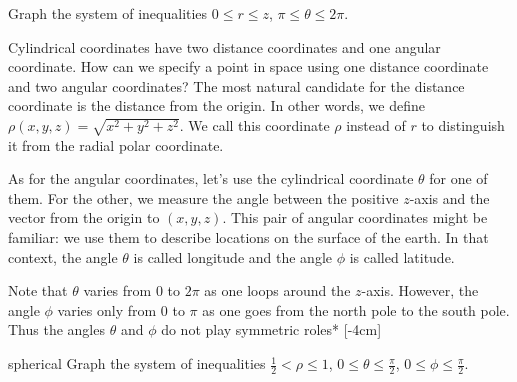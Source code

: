 \documentclass{watsonbook}
\begin{document}
\begin{exercise}{}{}
  Graph the system of inequalities $0 \leq r \leq z$, \: $\pi \leq \theta
  \leq 2\pi$. 
\end{exercise}

Cylindrical coordinates have two distance coordinates and one angular
coordinate. How can we specify a point in space using one distance
coordinate and two angular coordinates? The most natural candidate for
the distance coordinate is the distance from the origin. In other
words, we define $\rho(x,y,z) = \sqrt{x^2 + y^2 + z^2}$. We call this coordinate
$\rho$ instead of $r$ to distinguish it from the radial polar coordinate.

As for the angular coordinates, let's use the cylindrical coordinate
$\theta$ for one of them. For the other, we measure the angle between
the positive $z$-axis and the vector from the origin to
$(x,y,z)$. This pair of angular coordinates might be familiar: we use
them to describe locations on the surface of the earth. In that
context, the angle $\theta$ is called longitude and the angle $\phi$
is called latitude.

Note that $\theta$ varies from 0 to $2\pi$ as one loops around the
$z$-axis. However, the angle $\phi$ varies only from 0 to $\pi$ as one
goes from the north pole to the south pole. Thus the angles $\theta$
and $\phi$ do not play symmetric roles* [-4cm]

\begin{example}{}{spherical}
  Graph the system of inequalities $\tfrac{1}{2} < \rho \leq 1$, \: $0
  \leq \theta \leq \tfrac{\pi}{2}$, \: $0 \leq \phi \leq \tfrac{\pi}{2}$. 
\end{example}
\end{document}
